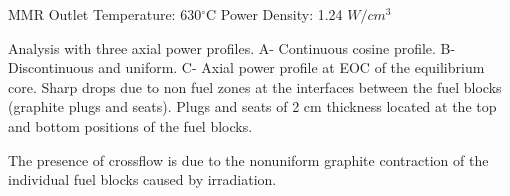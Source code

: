 MMR
Outlet Temperature: 630$^{\circ}$C
Power Density: 1.24 $W/cm^3$
\cite{usnc_mmr_2019}


Analysis with three axial power profiles.
A- Continuous cosine profile.
B- Discontinuous and uniform.
C- Axial power profile at EOC of the equilibrium core.
Sharp drops due to non fuel zones at the interfaces between the fuel blocks (graphite plugs and seats). Plugs and seats of 2 cm thickness located at the top and bottom positions of the fuel blocks.
\cite{tak_practical_2012}

The presence of crossflow is due to the nonuniform graphite contraction of the individual fuel blocks caused by irradiation.
\cite{malek_analysis_1968}